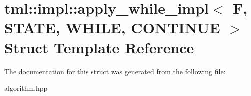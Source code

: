 \hypertarget{structtml_1_1impl_1_1apply__while__impl}{\section{tml\+:\+:impl\+:\+:apply\+\_\+while\+\_\+impl$<$ F, S\+T\+A\+T\+E, W\+H\+I\+L\+E, C\+O\+N\+T\+I\+N\+U\+E $>$ Struct Template Reference}
\label{structtml_1_1impl_1_1apply__while__impl}
}


The documentation for this struct was generated from the following file\+:\begin{DoxyCompactItemize}
\item 
algorithm.\+hpp\end{DoxyCompactItemize}
